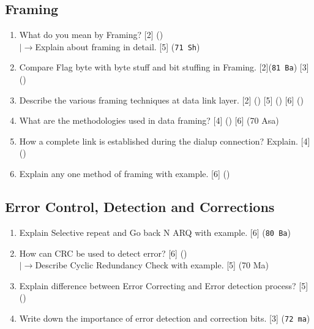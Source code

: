 \documentclass[12pt]{article}
\newcommand{\lb}{\\$\left|\rightarrow\right.$}
\begin{document}
	\subsection{Framing}
		\begin{enumerate}[noitemsep, topsep=0pt]
			\item What do you mean by Framing? \hfill [2] () 
			\lb Explain about framing in detail. \hfill [5] (\texttt{71 Sh})

			\item Compare Flag byte with byte stuff and bit stuffing in Framing. \hfill [2](\texttt{81 Ba}) [3] () 

			\item Describe the various framing techniques at data link layer. \hfill [2] () [5] () [6] ()

			\item What are the methodologies used in data framing? \hfill [4] () [6] (70 Asa)

			\item How a complete link is established during the dialup connection? Explain. \hfill[4] ()

			\item Explain any one method of framing with example. \hfill [6] ()
		\end{enumerate}

	\subsection{Error Control, Detection and Corrections}
		\begin{enumerate}[noitemsep, topsep=0pt]
			\item Explain Selective repeat and Go back N ARQ with example. \hfill [6] (\texttt{80 Ba})

			\item How can CRC be used to detect error? \hfill [6] ()
			\lb Describe Cyclic Redundancy Check with example. \hfill [5] (70 Ma)

			\item Explain difference between Error Correcting and Error detection process? \hfill [5] ()

			\item Write down the importance of error detection and correction bits. \hfill [3] (\texttt{72 ma})
		\end{enumerate}
\end{document}
